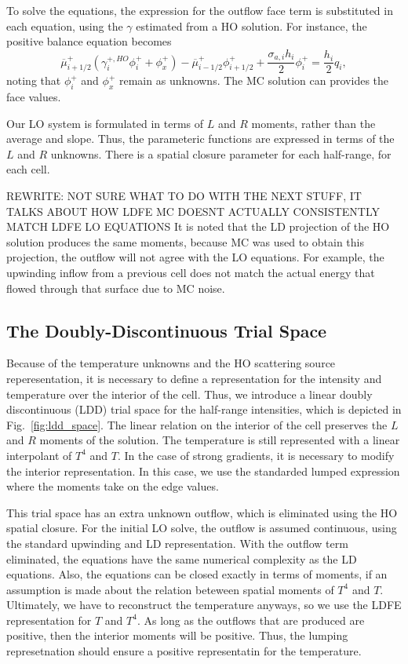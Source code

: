 To solve the equations, the expression for the outflow face term is substituted in each equation, using the
$\gamma$ estimated from a HO solution.
For instance, the positive balance equation becomes
\begin{equation}
    \overline\mu^+_{i+1/2}\left( \gamma_i^{+,HO} \phi_i^+ + \phi_x^+ \right) - \overline\mu^+_{i-1/2}\phi_{i+1/2}^+ +
    \frac{\sigma_{a,i}h_i}{2} \phi_i^+ = \frac{h_i}{2} q_i,
    \label{eqn:clsd_posbal}
\end{equation}
noting that $\phi_i^+$ and $\phi_x^+$ remain as unknowns. The MC solution can provides the
face values.

Our LO system is formulated in terms of $L$ and $R$ moments, rather than the average and
slope.  Thus, the parameteric functions are expressed in terms of the $L$ and $R$
unknowns.  There is a spatial closure parameter for each half-range, for each cell.

REWRITE: NOT SURE WHAT TO DO WITH THE NEXT STUFF, IT TALKS ABOUT HOW LDFE MC DOESNT ACTUALLY
CONSISTENTLY MATCH LDFE LO EQUATIONS
It is noted that the LD projection of the HO solution produces the same moments, because
MC was used to obtain this projection, the outflow will not agree with the LO equations.
For example, the upwinding inflow from a previous cell does not match the actual energy
that flowed through that surface due to MC noise.

\subsection{The Doubly-Discontinuous Trial Space}

Because of the temperature unknowns and the HO scattering source reperesentation, it is necessary to define a representation for
the intensity and temperature over the interior of the cell.  Thus, we introduce a linear doubly
discontinuous (LDD) trial space for the half-range intensities, which is depicted in Fig.~\ref{fig:ldd_space}.
The linear relation on the interior of the cell preserves the $L$ and $R$ moments of the
solution.  The temperature is still represented with a linear interpolant of $T^4$ and
$T$.  In the case of strong gradients, it is necessary to modify the interior representation.  In this case, 
we use the standarded lumped expression where the moments take on the edge values.

This trial space has an extra unknown outflow, which is eliminated using the HO spatial
closure.  For the initial LO solve, the outflow is assumed continuous, using the standard
upwinding and LD representation.  With the outflow term eliminated, the equations
have the same numerical complexity as the LD equations.  Also, the equations can be
closed exactly in terms of moments, if an assumption is made about the relation
beteween spatial moments of $T^4$ and $T$.  Ultimately, we have to reconstruct the
temperature anyways, so we use the LDFE representation for $T$ and $T^4$.  As long as
the outflows that are produced are positive, then the interior moments will be
positive.  Thus, the lumping represetnation should ensure a positive representatin
for the temperature.

